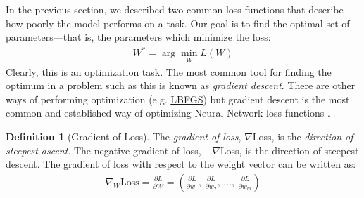 \documentclass[11pt]{article}
\numberwithin{equation}{section}
\theoremstyle{definition}%
\newtheorem{definition}{Definition}[section]%
\newcommand{\Loss}{L}
\begin{document}
In the previous section, we described two common loss functions that describe how poorly the model performs on a task. Our goal is to find the optimal set of parameters---that is, the parameters which minimize the loss:
\begin{align}%
    W^{\ast} = \arg \min_{W} \Loss(W)
\end{align}%
Clearly, this is an optimization task. The most common tool for finding the optimum in a problem such as this is known as \emph{gradient descent}. There are other ways of performing optimization (e.g. \href{https://pytorch.org/docs/stable/generated/torch.optim.LBFGS.html}{LBFGS}) but gradient descent is the most common and established way of optimizing Neural Network loss functions \cite{Stanford}.

\begin{definition}[Gradient of Loss]
    The \emph{gradient of loss}, $\nabla$Loss, is the \emph{direction of steepest ascent}. The negative gradient of loss, $-\nabla$Loss, is the direction of steepest descent. The gradient of loss with respect to the weight vector can be written as:
    \begin{align}
        \nabla_W \text{Loss} = \frac{\partial \Loss}{\partial W} = \left( \frac{\partial \Loss}{\partial w_1},\, \frac{\partial \Loss}{\partial w_2},\, \ldots,\, \frac{\partial \Loss}{\partial w_m} \right)
    \end{align}
\end{definition}
\end{document}
